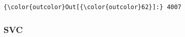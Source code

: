 \documentclass[8pt,onecolumn,aps,pra]{revtex4-1}
\begin{document}
    \begin{center}
    \end{center}
    { \hspace*{\fill} \\}
    
    \begin{center}
    \end{center}
    { \hspace*{\fill} \\}
    
\begin{Verbatim}[commandchars=\\\{\}]
{\color{outcolor}Out[{\color{outcolor}62}]:} 4007
\end{Verbatim}
            
    \hypertarget{svc}{%
\subsubsection{SVC}\label{svc}}
\end{document}
